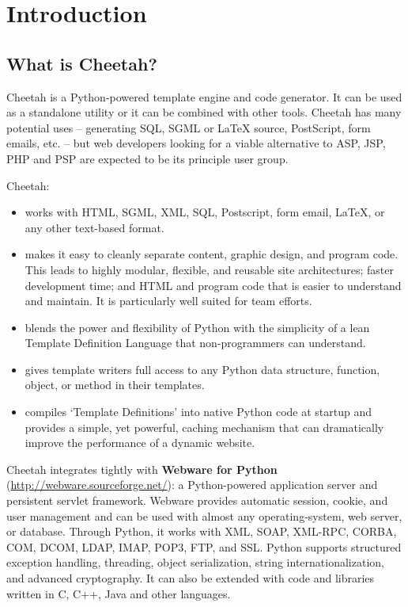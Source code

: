 \section{Introduction}
\label{intro}

\subsection{What is Cheetah?}
\label{intro.whatIs}

Cheetah is a Python-powered template engine and code generator.  It can be used
as a standalone utility or it can be combined with other tools.  Cheetah has
many potential uses -- generating SQL, SGML or LaTeX source, PostScript, form
emails, etc. -- but web developers looking for a viable alternative to ASP, JSP,
PHP and PSP are expected to be its principle user group.

Cheetah:
\begin{itemize}        
\item works with HTML, SGML, XML, SQL, Postscript, form email, LaTeX, or any
     other text-based format.
     
\item makes it easy to cleanly separate content, graphic design, and program
     code.  This leads to highly modular, flexible, and reusable site
     architectures; faster development time; and HTML and program code that is
     easier to understand and maintain. It is particularly well suited for team
     efforts.
     
\item blends the power and flexibility of Python with the simplicity of a lean
     Template Definition Language that non-programmers can understand.  
     
\item gives template writers full access to any Python data structure,
     function, object, or method in their templates.
     
\item compiles `Template Definitions' into native Python code at startup and
     provides a simple, yet powerful, caching mechanism that can dramatically
     improve the performance of a dynamic website.

\end{itemize}   

Cheetah integrates tightly with {\bf Webware for Python}
(\url{http://webware.sourceforge.net/}): a Python-powered application server and
persistent servlet framework. Webware provides automatic session, cookie, and user
management and can be used with almost any operating-system, web server, or
database. Through Python, it works with XML, SOAP, XML-RPC, CORBA, COM, DCOM,
LDAP, IMAP, POP3, FTP, and SSL. Python supports structured exception handling,
threading, object serialization, string internationalization, and advanced
cryptography. It can also be extended with code and libraries written in C, C++,
Java and other languages.

